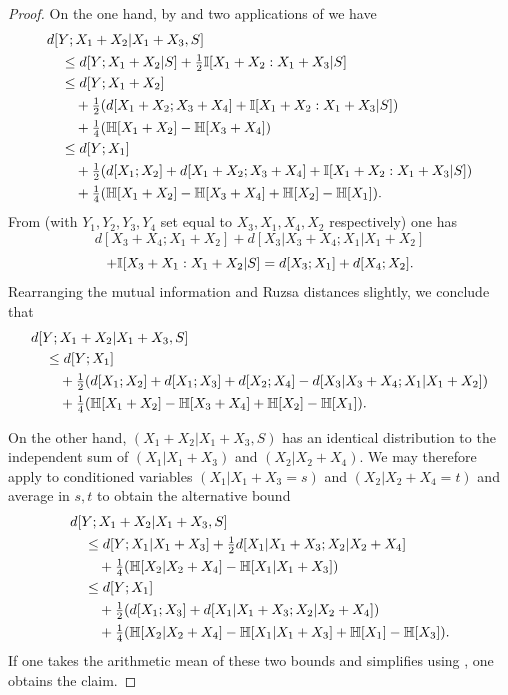 \begin{proof}\leanok
  On the one hand, by  and two applications of  we have
  \begin{align*}
  &d[Y;X_1+X_2|X_1 + X_3, S] \\
  &\quad \leq d[Y;X_1+X_2|S] + \tfrac{1}{2} \mathbb{I}[X_1 + X_2 : X_1 + X_3|S] \\
  &\quad \leq d[Y;X_1+X_2]\\
  &\qquad + \tfrac{1}{2} (d[X_1+X_2;X_3+X_4] + \mathbb{I}[X_1 + X_2 : X_1 + X_3|S])\\
  &\qquad + \tfrac{1}{4} (\mathbb{H}[X_1+X_2] - \mathbb{H}[X_3+X_4])\\
  &\quad \leq d[Y;X_1] \\
  &\qquad + \tfrac{1}{2} (d[X_1;X_2] + d[X_1+X_2;X_3+X_4] + \mathbb{I}[X_1 + X_2 : X_1 + X_3|S])\\
  &\qquad + \tfrac{1}{4} (\mathbb{H}[X_1+X_2] - \mathbb{H}[X_3+X_4] + \mathbb{H}[X_2] - \mathbb{H}[X_1]).
  \end{align*}
  From  (with $Y_1,Y_2,Y_3,Y_4$ set equal to $X_3, X_1, X_4, X_2$ respectively) one has
  $$ d[X_3+X_4; X_1+X_2] + d[X_3|X_3+X_4; X_1|X_1+X_2] $$
  $$ + \mathbb{I}[X_3 + X_1 : X_1 + X_2|S] = d[X_3;X_1] + d[X_4;X_2].$$
Rearranging the mutual information and Ruzsa distances slightly, we conclude that
\begin{align*}
  &d[Y;X_1+X_2|X_1 + X_3, S] \\
  &\quad \leq d[Y;X_1] \\
  &\qquad + \tfrac{1}{2} (d[X_1;X_2] + d[X_1;X_3] + d[X_2;X_4] - d[X_3|X_3+X_4; X_1|X_1+X_2])\\
  &\qquad + \tfrac{1}{4} (\mathbb{H}[X_1+X_2] - \mathbb{H}[X_3+X_4] + \mathbb{H}[X_2] - \mathbb{H}[X_1]).
  \end{align*}



  On the other hand, $(X_1+X_2|X_1 + X_3, S)$ has an identical distribution to the independent sum of $(X_1|X_1+X_3)$ and $(X_2|X_2+X_4)$.  We may therefore apply  to conditioned variables $(X_1|X_1+X_3=s)$ and $(X_2|X_2+X_4=t)$ and average in $s,t$ to
  obtain the alternative bound
  \begin{align*}
  &  d[Y;X_1+X_2|X_1 + X_3, S] \\
  &\quad \leq d[Y;X_1|X_1+X_3] + \tfrac{1}{2} d[X_1|X_1+X_3; X_2|X_2+X_4] \\
  &\qquad + \tfrac{1}{4} (\mathbb{H}[X_2|X_2+X_4] - \mathbb{H}[X_1|X_1+X_3]) \\
  &\quad  \leq d[Y;X_1] \\
  &\qquad + \tfrac{1}{2} (d[X_1;X_3] + d[X_1|X_1+X_3;X_2|X_2+X_4])\\
  &\qquad + \tfrac{1}{4} (\mathbb{H}[X_2|X_2+X_4] - \mathbb{H}[X_1|X_1+X_3] + \mathbb{H}[X_1] - \mathbb{H}[X_3]).
  \end{align*}
  If one takes the arithmetic mean of these two bounds and simplifies using , one obtains the claim.
\end{proof}

